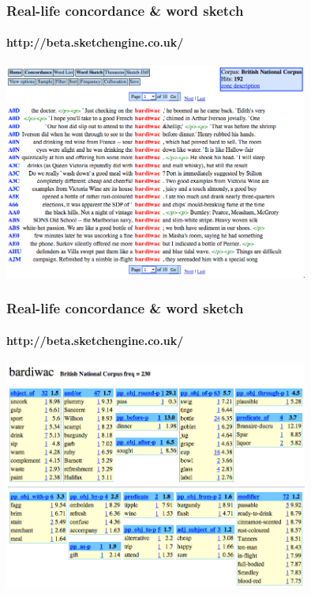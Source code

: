 \begin{frame}[c]
  \frametitle{Real-life concordance \& word sketch}
  \framesubtitle{http://beta.sketchengine.co.uk/}

  \begin{center}
    \includegraphics[width=10cm]{img/SE_bardiwac_conc}
  \end{center}
\end{frame}

\begin{frame}[c]
  \frametitle{Real-life concordance \& word sketch}
  \framesubtitle{http://beta.sketchengine.co.uk/}

  \begin{center}
    \ungap[1]
    \includegraphics[width=10cm]{img/SE_bardiwac_sketch}
  \end{center}
\end{frame}

